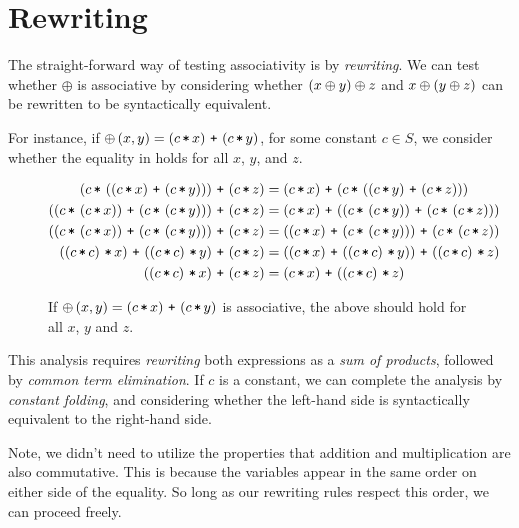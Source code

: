 
\section{Rewriting}\label{section:rewriting}

The straight-forward way of testing associativity is by \emph{rewriting}. We
can test whether $\oplus$ is associative by considering whether $\left({x \oplus y}\right)
\oplus z$ and $x \oplus \left({y \oplus z}\right)$ can be rewritten to be syntactically
equivalent.

For instance, if $\oplus\p{x,y} = \p{c \lt x} \lp \p{c \lt y}$, for some
constant $c\in S$, we consider whether the equality in
 holds for all $x$, $y$, and $z$.

\begin{figure*}[htbp!]
\begin{align*}
\p{c \lt \p{\p{c\lt x} \lp \p{c\lt y}}} \lp \p{c \lt z} &= \p{c\lt x} \lp \p{c
\lt \p{\p{c\lt y} \lp \p{c\lt z}}} \\
\p{\p{c\lt \p{c \lt x}} \lp \p{c\lt \p{c \lt y}}} \lp \p{c\lt z} &= \p{c\lt x} \lp
\p{\p{c\lt \p{c \lt y}} \lp \p{c\lt \p{c \lt z}}} \\
\p{\p{c\lt \p{c \lt x}} \lp \p{c\lt \p{c \lt y}}} \lp \p{c\lt z} &= \p{\p{c\lt
x} \lp \p{c\lt \p{c \lt y}}} \lp \p{c\lt \p{c \lt z}} \\
\p{\p{c\lt c} \lt x} \lp \p{\p{c\lt c} \lt y} \lp \p{c\lt z} &= \p{\p{c\lt
x} \lp \p{\p{c\lt c} \lt y}} \lp \p{\p{c\lt c} \lt z} \\
\p{\p{c\lt c} \lt x} \lp \p{c\lt z} &= \p{c\lt x} \lp \p{\p{c\lt c} \lt z}
\end{align*}
\caption[]{If $\oplus\p{x,y}=\p{c\lt x} \lp \p{c\lt y}$ is associative, the
above should hold for all $x$, $y$ and $z$.}
\label{figure:first-equality}
\end{figure*}

This analysis requires \emph{rewriting} both expressions as a \emph{sum of
products}, followed by \emph{common term elimination}. If $c$ is a constant, we
can complete the analysis by \emph{constant folding}, and considering whether
the left-hand side is syntactically equivalent to the right-hand side.

Note, we didn't need to utilize the properties that addition and multiplication
are also commutative.  This is because the variables appear in the same order
on either side of the equality. So long as our rewriting rules respect this
order, we can proceed freely. 

